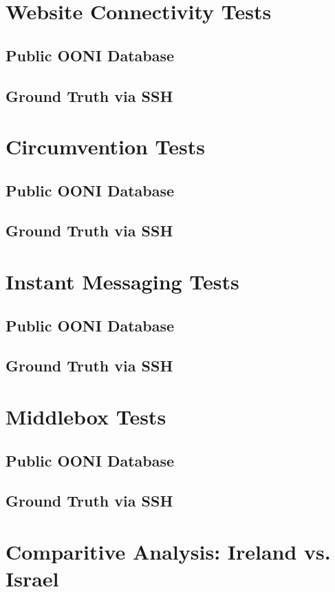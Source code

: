 \section{Website Connectivity Tests}
\subsection{Public OONI Database}
\subsection{Ground Truth via SSH}


\section{Circumvention Tests}
\subsection{Public OONI Database}
\subsection{Ground Truth via SSH}

\section{Instant Messaging Tests}
\subsection{Public OONI Database}
\subsection{Ground Truth via SSH}

\section{Middlebox Tests}
\subsection{Public OONI Database}
\subsection{Ground Truth via SSH}

\section{Comparitive Analysis: Ireland vs. Israel}
